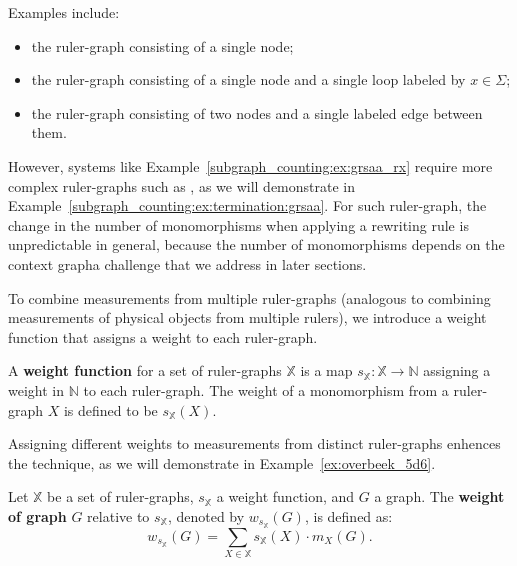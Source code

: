 Examples include: 
\begin{itemize}
    \item  the ruler-graph  consisting of a single node;
    \item the ruler-graph  consisting of a single node and a single loop labeled by $x\in \Sigma$; 
    \item the ruler-graph  consisting of two nodes and a single labeled edge between them.  
\end{itemize}
    
However, systems like Example~\ref{subgraph_counting:ex:grsaa_rx} require more complex ruler-graphs such as , as we will demonstrate in Example~\ref{subgraph_counting:ex:termination:grsaa}.
    For such ruler-graph, the change in the number of monomorphisms when applying a rewriting rule is unpredictable in general, because the number of monomorphisms 
    depends on the context graph\textemdash a challenge that we address in later sections.
    
To combine measurements from multiple ruler-graphs (analogous to combining measurements of physical objects from multiple rulers), we introduce a weight function that assigns a weight to each ruler-graph.
\begin{definition} 
    \label{subgraph_counting:def:weight_function}
    A \textbf{weight function} for a set of ruler-graphs \( \mathbb{X} \) is a map \( s_{\mathbb{X}} \mathop{\colon} \mathbb{X} \mathop{\to} \mathbb{N} \) assigning a weight in $\mathbb{N}$ to each ruler-graph. The weight of a monomorphism from a ruler-graph $X$ is defined to be $s_\mathbb{X}(X)$. 
\end{definition}
Assigning different weights to measurements from distinct ruler-graphs enhences the technique, as we will demonstrate in Example~\ref{ex:overbeek_5d6}.
\begin{definition} 
    \label{subgraph_counting:def:graph_weight}  
    Let \( \mathbb{X} \) be a set of ruler-graphs, 
    \( s_{\mathbb{X}} \) a weight function, and \( G \) a graph. The \textbf{weight of graph} \( G \) relative to \( s_{\mathbb{X}} \), denoted by \( w_{s_{\mathbb{X}}}(G) \), is defined as: 
    \[
        w_{s_{\mathbb{X}}}(G) \mathop{=} \sum_{X \mathop{\in} \mathbb{X}} s_{\mathbb{X}}(X) \cdot m_X(G).  
    \]  
\end{definition} 

